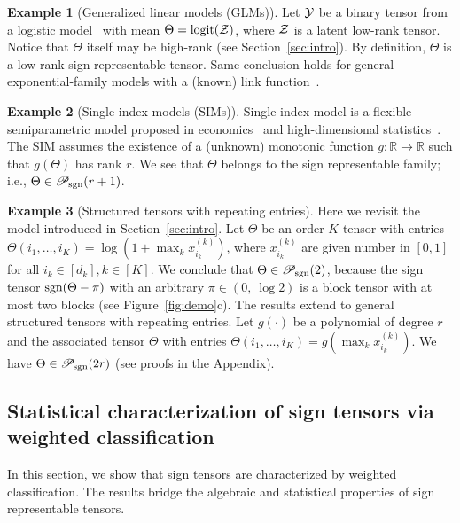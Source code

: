 \documentclass{article}
\theoremstyle{plain}
\theoremstyle{definition}
\newtheorem{example}{Example}
\def\sign{\textup{sgn}}
\def\caliP{\mathscr{P}_{\textup{sgn}}}
\begin{document}
\begin{example}[Generalized linear models (GLMs)] Let $\mathcal{Y}$ be a binary tensor from a logistic model~\citep{wang2018learning} with mean $\Theta=\text{logit}(\mathcal{Z})$, where $\mathcal{Z}$ is a latent low-rank tensor. Notice that $\Theta$ itself may be high-rank (see Section~\ref{sec:intro}). By definition, $\Theta$ is a low-rank sign representable tensor. Same conclusion holds for general exponential-family models with a (known) link function~\citep{hong2020generalized}. 
\end{example}

\begin{example}[Single index models (SIMs)] Single index model is a flexible semiparametric model proposed in economics~\citep{robinson1988root} and high-dimensional statistics~\citep{balabdaoui2019least,ganti2017learning}. The SIM assumes the existence of a (unknown) monotonic function $g\colon \mathbb{R}\to \mathbb{R}$ such that $g(\Theta)$ has rank $r$. We see that $\Theta$ belongs to the sign representable family; i.e., $\Theta\in \caliP(r+1)$. 
\end{example}

\begin{example}[Structured tensors with repeating entries]\label{eq:example} Here we revisit the model introduced in Section~\ref{sec:intro}. Let $\Theta$ be an order-$K$ tensor with entries $\Theta(i_1,\ldots,i_K)=\log(1+\max_kx^{(k)}_{i_k})$, where $x^{(k)}_{i_k}$ are given number in $[0,1]$ for all $i_k\in[d_k], k\in[K]$. We conclude that $\Theta \in \caliP(2)$, because the sign tensor $\sign(\Theta-\pi)$ with an arbitrary $\pi\in(0,\ \log 2)$ is a block tensor with at most two blocks (see Figure~\ref{fig:demo}c). The results extend to general structured tensors with repeating entries. Let $g(\cdot)$ be a polynomial of degree $r$ and the associated tensor $\Theta$ with entries $\Theta(i_1,\ldots,i_K)=g(\max_kx^{(k)}_{i_k})$. We have $\Theta\in \caliP(2r)$ (see proofs in the Appendix). 
\end{example}

\vspace{-.2cm}
\subsection{Statistical characterization of sign tensors via weighted classification}\label{sec:identifiability}
\vspace{-.2cm}
In this section, we show that sign tensors are characterized by weighted classification. The results bridge the algebraic and statistical properties of sign representable tensors.
 
\end{document}
